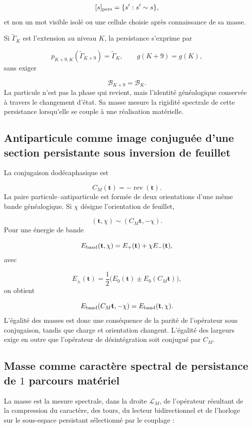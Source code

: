 \[
 [s]_{\rm pers}
 =\{s':s'\sim s\},
\]
et non un mot visible isolé ou une cellule choisie après connaissance de sa masse.

Si \(\widetilde\Gamma_K\) est l'extension au niveau \(K\), la persistance s'exprime par

\[
 p_{K+9,K}(\widetilde\Gamma_{K+9})
 =\widetilde\Gamma_K,\qquad
 g(K+9)=g(K),
\]
sans exiger

\[
 \mathcal B_{K+9}=\mathcal B_K.
\]
La particule n'est pas la phase qui revient, mais l'identité généalogique conservée à travers le changement d'état. Sa masse mesure la rigidité spectrale de cette persistance lorsqu'elle se couple à une réalisation matérielle.

\subsection{Antiparticule comme image conjuguée d'une section persistante sous inversion de feuillet}
La conjugaison dodécaphasique est

\[
 C_M(\mathbf t)=-\operatorname{rev}(\mathbf t).
\]
La paire particule--antiparticule est formée de deux orientations d'une même bande généalogique. Si \(\chi\) désigne l'orientation de feuillet,

\[
 (\mathbf t,\chi)\sim(C_M\mathbf t,-\chi).
\]
Pour une énergie de bande

\[
 E_{\rm band}(\mathbf t,\chi)
 =E_+(\mathbf t)+\chi E_-(\mathbf t),
\]
avec

\[
 E_\pm(\mathbf t)
 =\frac12\bigl(E_0(\mathbf t)\pm E_0(C_M\mathbf t)\bigr),
\]
on obtient

\[
 E_{\rm band}(C_M\mathbf t,-\chi)
 =E_{\rm band}(\mathbf t,\chi).
\]
L'égalité des masses est donc une conséquence de la parité de l'opérateur sous conjugaison, tandis que charge et orientation changent. L'égalité des largeurs exige en outre que l'opérateur de désintégration soit conjugué par \(C_M\).

\subsection{Masse comme caractère spectral de persistance de \(1\) parcours matériel}
La masse est la mesure spectrale, dans la droite \(\mathcal L_M\), de l'opérateur résultant de la compression du caractère, des tours, du lecteur bidirectionnel et de l'horloge sur le sous-espace persistant sélectionné par le couplage :

